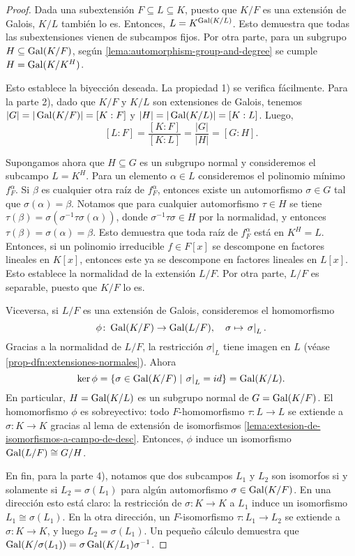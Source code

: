 \begin{teorema}
\begin{proof}
    Dada una subextensión $F \subseteq L \subseteq K$, puesto que $K/F$ es una
    extensión de Galois, $K/L$ también lo es. Entonces, $L = K^{\operatorname{Gal} (K/L)}$.
    Esto demuestra que todas las subextensiones vienen de subcampos fijos.
    Por otra parte, para un subgrupo $H \subseteq \operatorname{Gal} (K/F)$, según
    \ref{lema:automorphism-group-and-degree} se cumple $H = \operatorname{Gal} (K/K^H)$.

    Esto establece la biyección deseada. La propiedad 1) se verifica fácilmente.
    Para la parte 2), dado que $K/F$ y $K/L$ son extensiones de Galois, tenemos
    $|G| = |\operatorname{Gal} (K/F)| = [K:F]$ y $|H| = |\operatorname{Gal} (K/L)| = [K:L]$. Luego,
    $$[L : F] = \frac{[K : F]}{[K : L]} = \frac{|G|}{|H|} = [G : H].$$

    Supongamos ahora que $H \subseteq G$ es un subgrupo normal y consideremos
    el subcampo $L = K^H$. Para un elemento $\alpha \in L$ consideremos
    el polinomio mínimo $f^\alpha_F$. Si $\beta$ es cualquier otra raíz de
    $f^\alpha_F$, entonces existe un automorfismo $\sigma \in G$ tal que
    $\sigma (\alpha) = \beta$. Notamos que para cualquier automorfismo
    $\tau \in H$ se tiene
    $\tau (\beta) = \sigma (\sigma^{-1} \tau \sigma (\alpha))$, donde
    $\sigma^{-1} \tau \sigma \in H$ por la normalidad, y entonces
    $\tau (\beta) = \sigma (\alpha) = \beta$. Esto demuestra que toda raíz
    de $f^\alpha_F$ está en $K^H = L$. Entonces, si un polinomio irreducible
    $f \in F[x]$ se descompone en factores lineales en $K [x]$, entonces
    este ya se descompone en factores lineales en $L [x]$. Esto establece
    la normalidad de la extensión $L/F$. Por otra parte, $L/F$ es separable,
    puesto que $K/F$ lo es.

    Viceversa, si $L/F$ es una extensión de Galois, consideremos el homomorfismo
    $$\phi\colon \operatorname{Gal} (K/F) \to \operatorname{Gal} (L/F), \quad \sigma \mapsto \left.\sigma\right|_L.$$
    Gracias a la normalidad de $L/F$, la restricción $\left.\sigma\right|_L$
    tiene imagen en $L$ (véase \ref{prop-dfn:extensiones-normales}). Ahora
    $$\ker\phi = \{ \sigma \in \operatorname{Gal} (K/F) \mid \left.\sigma\right|_L = id \} = \operatorname{Gal} (K/L).$$
    En particular, $H = \operatorname{Gal} (K/L)$ es un subgrupo normal de $G = \operatorname{Gal} (K/F)$.
    El homomorfismo $\phi$ es sobreyectivo: todo $F$-homomorfismo
    $\tau\colon L \to L$ se extiende a $\sigma\colon K\to K$ gracias
    al lema de extensión de isomorfismos
    \ref{lema:extesion-de-isomorfismos-a-campo-de-desc}. Entonces, $\phi$ induce
    un isomorfismo $\operatorname{Gal} (L/F) \cong G/H$.

    En fin, para la parte 4), notamos que dos subcampos $L_1$ y $L_2$ son
    isomorfos si y solamente si $L_2 = \sigma (L_1)$ para algún automorfismo
    $\sigma \in \operatorname{Gal} (K/F)$. En una dirección esto está claro: la restricción de
    $\sigma\colon K\to K$ a $L_1$ induce un isomorfismo
    $L_1 \cong \sigma (L_1)$. En la otra dirección, un $F$-isomorfismo
    $\tau\colon L_1 \to L_2$ se extiende a $\sigma\colon K \to K$,
    y luego $L_2 = \sigma (L_1)$. Un pequeño cálculo demuestra que
    $\operatorname{Gal} (K/\sigma(L_1)) = \sigma \operatorname{Gal} (K/L_1) \sigma^{-1}$.
  \end{proof}
\end{teorema}

